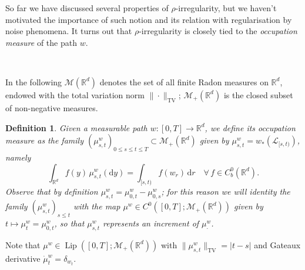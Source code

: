 \documentclass[10pt]{article}
\newcommand{\mathd}{\mathrm{d}}
\newcommand{\tmop}[1]{\ensuremath{\operatorname{#1}}}
\newcommand{\tmtextit}[1]{{\itshape{#1}}}
\newtheorem{definition}[theorem]{Definition}
\begin{document}
So far we have discussed several properties of $\rho$\mbox{-}irregularity, but
we haven't motivated the importance of such notion and its relation with
regularisation by noise phenomena. It turns out that
$\rho$\mbox{-}irregularity is closely tied to the \tmtextit{occupation
measure} of the path $w$.

\

In the following $\mathcal{M} (\mathbb{R}^d)$ denotes the set of all finite
Radon measures on $\mathbb{R}^d$, endowed with the total variation norm $\|
\cdot \|_{\tmop{TV}}$; $\mathcal{M}_+ (\mathbb{R}^d)$ is the closed subset of
non\mbox{-}negative measures.

\begin{definition}
  \label{sec2.3 defn occupation measure}Given a measurable path $w : [0, T]
  \rightarrow \mathbb{R}^d$, we define its occupation measure as the family
  $(\mu_{s, t}^w)_{0 \leqslant s \leqslant t \leqslant T} \subset
  \mathcal{M}_+ (\mathbb{R}^d)$ given by $\mu^w_{s, t} = w_{\ast}
  (\mathcal{L}_{[s, t)})$, namely
  \[ \int_{\mathbb{R}^d} f (y) \, \mu_{s, t}^w (\mathd y) = \int_{[s, t)} f
     (w_r) \, \mathd r \quad \forall \, f \in C^0_b (\mathbb{R}^d) . \]
  Observe that by definition $\mu^w_{s, t} = \mu^w_{0, t} - \mu^w_{0, s}$; for
  this reason we will identity the family $(\mu_{s, t}^w)_{s \leqslant t}$
  with the map $\mu^w \in C^0 ([0, T] ; \mathcal{M}_+ (\mathbb{R}^d))$ given
  by $t \mapsto \mu^w_t = \mu^w_{0, t}$, so that $\mu^w_{s, t}$ represents an
  increment of $\mu^w_{\cdot}$.
\end{definition}

Note that $\mu^w \in \tmop{Lip} ([0, T] ; \mathcal{M}_+ (\mathbb{R}^d))$ with
$\| \mu^w_{s, t} \|_{\tmop{TV}} = | t - s |$ and Gateaux derivative
$\dot{\mu}^w_t = \delta_{w_t}$.

\
\end{document}
